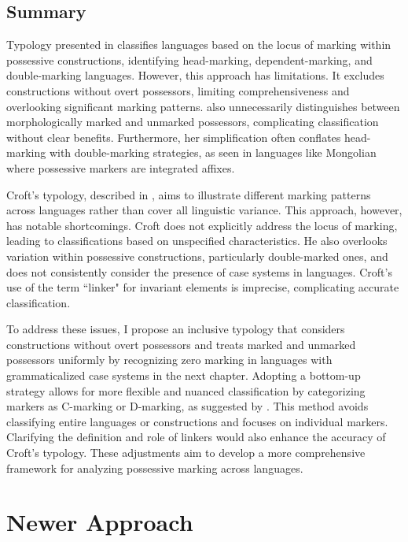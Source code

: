 \subsection{Summary}

Typology presented in \cite{nichols_locus_2013} classifies languages based on the locus of marking within possessive constructions, identifying head-marking, dependent-marking, and double-marking languages. However, this approach has limitations. It excludes constructions without overt possessors, limiting comprehensiveness and overlooking significant marking patterns. \cite{nichols_locus_2013} also unnecessarily distinguishes between morphologically marked and unmarked possessors, complicating classification without clear benefits. Furthermore, her simplification often conflates head-marking with double-marking strategies, as seen in languages like Mongolian where possessive markers are integrated affixes.

Croft's typology, described in \cite{croft2002typology}, aims to illustrate different marking patterns across languages rather than cover all linguistic variance. This approach, however, has notable shortcomings. Croft does not explicitly address the locus of marking, leading to classifications based on unspecified characteristics. He also overlooks variation within possessive constructions, particularly double-marked ones, and does not consistently consider the presence of case systems in languages. Croft's use of the term ``linker" for invariant elements is imprecise, complicating accurate classification.

To address these issues, I propose an inclusive typology that considers constructions without overt possessors and treats marked and unmarked possessors uniformly by recognizing zero marking in languages with grammaticalized case systems in the next chapter. Adopting a bottom-up strategy allows for more flexible and nuanced classification by categorizing markers as C-marking or D-marking, as suggested by \cite{lander2020head}. This method avoids classifying entire languages or constructions and focuses on individual markers. Clarifying the definition and role of linkers would also enhance the accuracy of Croft's typology. These adjustments aim to develop a more comprehensive framework for analyzing possessive marking across languages.

\section{Newer Approach}

